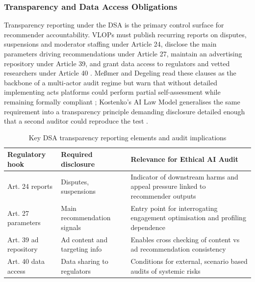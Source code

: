 \documentclass[11pt]{article}
\begin{document}
\subsubsection{Transparency and Data Access Obligations}
\label{sec:transparency_data_access} Transparency reporting under the DSA is the primary control surface for recommender accountability. VLOPs must publish recurring reports on disputes, suspensions and moderator staffing under Article 24, disclose the main parameters driving recommendations under Article 27, maintain an advertising repository under Article 39, and grant data access to regulators and vetted researchers under Article 40 \parencites[19]{3195574}[7]{1456534}[12]{6502223}. Me{\ss}mer and Degeling read these clauses as the backbone of a multi-actor audit regime but warn that without detailed implementing acts platforms could perform partial self-assessment while remaining formally compliant \parencites[6]{3195574}[19]{3195574}; Kostenko's AI Law Model generalises the same requirement into a transparency principle demanding disclosure detailed enough that a second auditor could reproduce the test \parencites[70]{2977039}.

\begin{table}[H] \centering \caption{Key DSA transparency reporting elements and audit implications} \label{tab:dsa_transparency_dims} \begin{tabular}{p{3.1cm}p{4.2cm}p{5.0cm}} \hline Regulatory hook & Required disclosure & Relevance for Ethical AI Audit \\ \hline Art. 24 reports & Disputes, suspensions & Indicator of downstream harms and appeal pressure linked to recommender outputs \\ Art. 27 parameters & Main recommendation signals & Entry point for interrogating engagement optimisation and profiling dependence \\ Art. 39 ad repository & Ad content and targeting info & Enables cross checking of content vs ad recommendation consistency \\ Art. 40 data access & Data sharing to regulators & Conditions for external, scenario based audits of systemic risks \\ \hline \end{tabular} \end{table}
\end{document}
